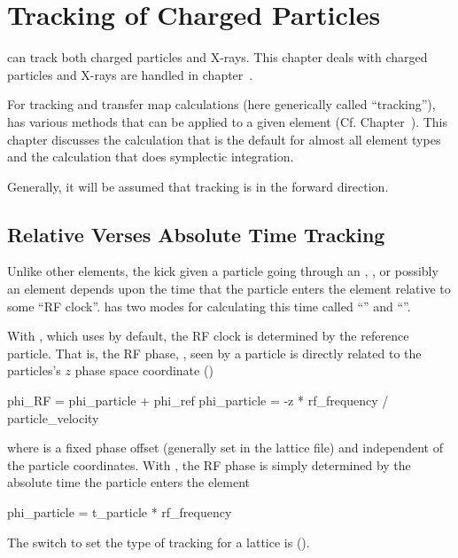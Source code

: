 \chapter{Tracking of Charged Particles}
\label{c:charged.track}

\bmad can track both charged particles and X-rays. This chapter deals
with charged particles and X-rays are handled in
chapter~.

For tracking and transfer map calculations (here generically called
``tracking''), \bmad has various methods that can be applied to a
given element (Cf. Chapter~). This chapter discusses
the  calculation that is the default for almost all
element types and the  calculation that does
symplectic integration.

Generally, it will be assumed that tracking is in the forward direction.

\section{Relative Verses Absolute Time Tracking}
\label{s:rf.time}

Unlike other elements, the kick given a particle going through an
, , or possibly an  element
depends upon the time that the particle enters the element relative to
some ``RF clock''. \bmad has two modes for calculating this time
called ``'' and ``''.

With , which \bmad uses by default, the RF
clock is determined by the reference particle. That is, the RF phase,
, seen by a particle is directly related to the particles's
$z$ phase space coordinate ()
\begin{example}
  phi_RF = phi_particle + phi_ref
  phi_particle = -z * rf_frequency / particle_velocity
\end{example}
where  is a fixed phase offset (generally set in the
lattice file) and independent of the particle coordinates. With
, the RF phase is simply determined by the
absolute time the particle enters the element
\begin{example}
  phi_particle = t_particle * rf_frequency
\end{example}
The switch to set the type of tracking for a lattice is
 ().

